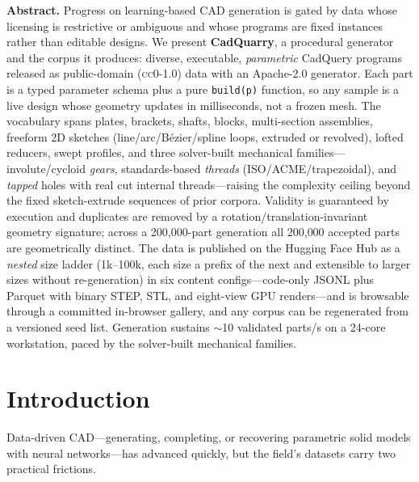 \documentclass[11pt]{article}
\newcommand{\code}[1]{\texttt{#1}}
\newcommand{\cc}{\textsc{cc0-1.0}}
\newcommand{\apache}{Apache-2.0}
\begin{document}
\begin{tcolorbox}[enhanced,colback=white,colframe=rule,boxrule=0.5pt,arc=2pt,
  left=12pt,right=12pt,top=8pt,bottom=8pt]
\noindent\textbf{\sffamily\color{ink}Abstract.}\;
Progress on learning-based CAD generation is gated by data whose licensing is
restrictive or ambiguous and whose programs are fixed instances rather than
editable designs. We present \textbf{CadQuarry}, a procedural generator and the
corpus it produces: diverse, executable, \emph{parametric} CadQuery programs
released as public-domain (\cc{}) data with an \apache{} generator. Each part is
a typed parameter schema plus a pure \code{build(p)} function, so any sample is a
live design whose geometry updates in milliseconds, not a frozen mesh. The
vocabulary spans plates, brackets, shafts, blocks, multi-section assemblies,
freeform 2D sketches (line/arc/B\'ezier/spline loops, extruded or revolved),
lofted reducers, swept profiles, and three solver-built mechanical
families---involute/cycloid \emph{gears}, standards-based \emph{threads}
(ISO/ACME/trapezoidal), and \emph{tapped} holes with real cut internal
threads---raising the complexity ceiling beyond the fixed sketch-extrude
sequences of prior corpora. Validity is guaranteed by execution
and duplicates are removed by a rotation/translation-invariant geometry
signature; across a 200{,}000-part generation all 200{,}000 accepted parts are
geometrically distinct. The data is published on the Hugging Face Hub as a
\emph{nested} size ladder (1k--100k, each size a prefix of the next and
extensible to larger sizes without re-generation) in six content
configs---code-only JSONL plus Parquet with binary STEP, STL, and eight-view GPU
renders---and is browsable through a committed in-browser gallery, and any corpus
can be regenerated from a versioned seed list. Generation sustains \mbox{$\sim$10} validated parts/s on a 24-core
workstation, paced by the solver-built mechanical families.
\end{tcolorbox}

\section{Introduction}
Data-driven CAD---generating, completing, or recovering parametric solid models
with neural networks---has advanced quickly, but the field's datasets carry two
practical frictions.
\end{document}
